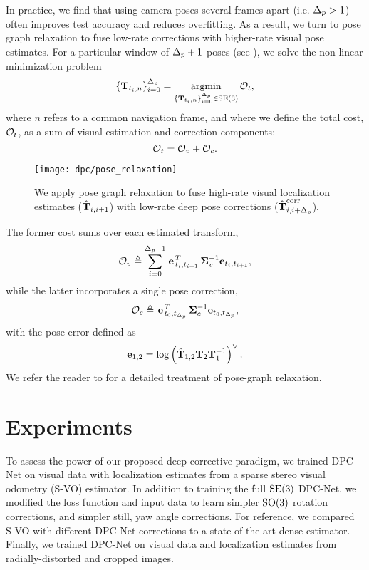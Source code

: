 In practice, we find that using camera poses several frames apart (i.e. $\Delta_p > 1$) often improves test accuracy and reduces overfitting. As a result, we turn to pose graph relaxation to fuse low-rate corrections with higher-rate visual pose estimates. For a particular window of $\Delta_p + 1$ poses (see ), we solve the non linear minimization problem
\begin{equation}
	\{\boldsymbol{\mathbf{T}}_{t_i, n} \}_{i=0}^{\Delta_p} = \operatorname*{argmin}_{\{\boldsymbol{\mathbf{T}}_{t_i, n} \}_{i=0}^{\Delta_p} \in \mathrm{SE}(3)} \mathcal{O}_t,
\end{equation}
where $n$ refers to a common navigation frame, and where we define the total cost, $\mathcal{O}_t$, as a sum of visual estimation and correction components:
\begin{equation}
	\mathcal{O}_t = \mathcal{O}_v + \mathcal{O}_c.
\end{equation}

\begin{figure}
	\centering
	\texttt{[image: dpc/pose\_relaxation]}
	\caption{We apply pose graph relaxation to fuse high-rate visual localization estimates ($\hat{\boldsymbol{\mathbf{T}}}_{i,i+1}$) with low-rate deep pose corrections ($\hat{\boldsymbol{\mathbf{T}}}_{i,i+\Delta_p}^{\text{corr}}$).}
	\label{fig:posegraph_relaxation}
	\vspace{-1em}
\end{figure}

\noindent The former cost sums over each estimated transform,
\begin{equation}
	\mathcal{O}_v \triangleq \sum_{i=0}^{\Delta_p-1}\left.{\boldsymbol{\mathbf{e}}}\right.^T_{t_i,t_{i+1}}\boldsymbol{\mathbf{\Sigma}}_v^{-1} \boldsymbol{\mathbf{e}}_{t_i,t_{i+1}},
\end{equation}
while the latter incorporates a single pose correction,
\begin{equation}
	\mathcal{O}_c \triangleq \left.{\boldsymbol{\mathbf{e}}}\right.^T_{t_0,t_{\Delta_p}}\boldsymbol{\mathbf{\Sigma}}_c^{-1} \boldsymbol{\mathbf{e}}_{t_0,t_{\Delta_p}},
\end{equation}
with the pose error defined as 
\begin{equation}
	\boldsymbol{\mathbf{e}}_{1,2} = \mathrm{log}\left({\hat{\boldsymbol{\mathbf{T}}}_{1,2} \boldsymbol{\mathbf{T}}_{2}  \boldsymbol{\mathbf{T}}^{-1}_{1}}\right)^{\vee}.
\end{equation}
We refer the reader to \cite{Barfoot2017-ri} for a detailed treatment of pose-graph relaxation.

\section{Experiments}
To assess the power of our proposed deep corrective paradigm, we trained DPC-Net on visual data with localization estimates from a sparse stereo visual odometry (S-VO) estimator. In addition to training the full $\mathrm{SE}(3)$ DPC-Net, we modified the loss function and input data to learn simpler $\mathrm{SO}(3)$ rotation corrections, and simpler still, yaw angle corrections. For reference, we compared S-VO with different DPC-Net corrections to a state-of-the-art dense estimator. Finally, we trained DPC-Net on visual data and localization estimates from radially-distorted and cropped images. 

